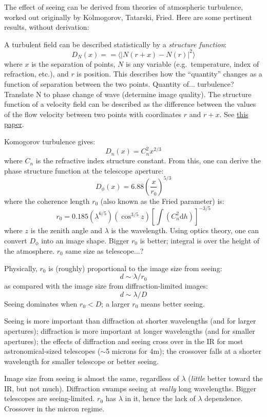 \documentclass[12pt]{article}
\newcommand{\mynotes}[1]{\textcolor{myBlue}{#1}}
\begin{document}
The effect of seeing can be derived from theories of atmospheric turbulence,
worked out originally by Kolmogorov, Tatarski, Fried. Here are some pertinent
results, without derivation:

A turbulent field can be described statistically by a \textit{structure
function}:
\[
    D_{N}(x) = = \langle | N(r+x) - N(r) | ^{2} \rangle
    \]
where $x$ is the separation of points, $N$ is any variable (e.g.\ temperature,
index of refraction, etc.), and $r$ is position.
\mynotes{This describes how the
``quantity'' changes as a function of separation between the two points.
Quantity of$\ldots$ turbulence?
Translate N to phase change of wave (determine image quality).
The structure function of a velocity field can be described as the
difference between the values of the flow velocity between two points
with coordinates $r$ and $r+x$. See \href{http://jetp.ac.ru/cgi-bin/dn/e_082_03_0580.pdf}
{this paper}.}

Komogorov turbulence gives:
\[
    D_{n}(x) = C_{n}^{2}x^{2/3}
    \]
where $C_{n}$ is the refractive index structure constant. From this, one can
derive the phase structure function at the telescope aperture:
\[
    D_{\phi}(x) = 6.88 \left( \frac{x}{r_{0}} \right) ^{5/3}
    \]
where the coherence length $r_{0}$ (also known as the Fried parameter) is:
\[
    r_{0} = 0.185\left( \lambda^{6/5} \right)
    \left( \cos^{3/5}z \right)
    \left[ \int \left( C_{n}^{2}\textrm{d}h \right)\right]^{-3/5}
    \]
where $z$ is the zenith angle and $\lambda$ is the wavelength.
Using optics theory, one can convert $D_{\phi}$ into an image shape.
\mynotes{Bigger $r_{0}$ is better; integral is over the height
of the atmosphere. $r_{0}$ same size as telescope$\ldots$?}

Physically, $r_{0}$ is (roughly) proportional to the image size from
seeing:
\[
    d \sim \lambda/r_{0}
    \]
as compared with the image size from diffraction-limited images:
\[
    d \sim \lambda/D
    \]
Seeing dominates when $r_{0} < D$; a larger $r_{0}$ means better seeing.

Seeing is more important than diffraction at shorter wavelengths (and for
larger apertures); diffraction is more important at longer wavelengths (and for
smaller apertures); the effects of diffraction and seeing cross over in the IR
for most astronomical-sized telescopes ($\sim$5 microns for 4m); the crossover
falls at a shorter wavelength for smaller telescope or better seeing.

\mynotes{Image size from seeing is almost the same, regardless of $\lambda$
(\emph{little} better toward the IR, but not much). Diffraction swamps seeing
at \emph{really} long wavelengths. Bigger telescopes are seeing-limited.
$r_{0}$ has $\lambda$ in it, hence the lack of $\lambda$ dependence. Crossover
in the micron regime.}
\end{document}
